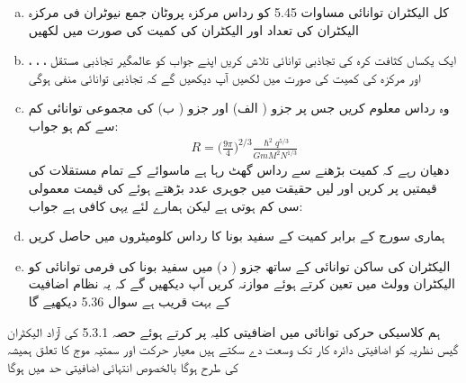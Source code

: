 \begin{enumerate}[a.]
\item
کل الیکٹران توانائی مساوات 5.45 کو رداس مرکزہ پروٹان جمع نیوٹران  فی مرکزہ الیکٹران کی تعداد  اور الیکٹران کی کمیت  کی صورت میں لکھیں 
\item
ایک یکساں  کثافت کرہ   کی تجاذبی توانائی تلاش کریں اپنے جواب کو عالمگیر تجاذبی مستقل ، ، ، اور مرکزہ کی کمیت  کی صورت میں لکھیں آپ دیکھیں گے کہ تجاذبی توانائی منفی ہوگی 
\item
وہ رداس معلوم کریں جس پر جزو ( الف) اور جزو ( ب) کی مجموعی توانائی کم سے کم ہو جواب:
\begin{align*}
R = \big ( \frac{9 \pi}{4} \big )^{2/3} \frac{\hslash^2 q^{5/3}}{GmM^2 N^{1/3}}
\end{align*}
دھیان رہے کہ کمیت بڑھنے سے رداس گھٹ رہا ہے ماسوائے  کے تمام مستقلات کی قیمتیں پر کریں اور  لیں حقیقت میں جوہری عدد بڑھتے ہوئے  کی قیمت معمولی سی کم ہوتی ہے لیکن ہمارے لئے یہی کافی ہے جواب:   \item ہماری سورج کے برابر کمیت کے سفید بونا کا رداس کلومیٹروں میں حاصل کریں 
\item
الیکٹران کی ساکن توانائی کے ساتھ جزو ( د) میں سفید بونا کی فرمی توانائی کو الیکٹران وولٹ میں تعین کرتے ہوئے موازنہ کریں آپ دیکھیں گے کہ یہ نظام اضافیت کے بہت قریب ہے سوال 5.36 دیکھیے گا
\end{enumerate}
ہم کلاسیکی حرکی توانائی  میں اضافیتی کلیہ  پر کرتے ہوئے حصہ 5.3.1 کی آزاد الیکٹران گیس نظریہ کو اضافیتی دائرہ کار تک وسعت دے سکتے ہیں معیار حرکت اور سمتیہ موج کا تعلق ہمیشہ کی طرح  ہوگا بالخصوص انتہائی اضافیتی حد میں  ہوگا 
